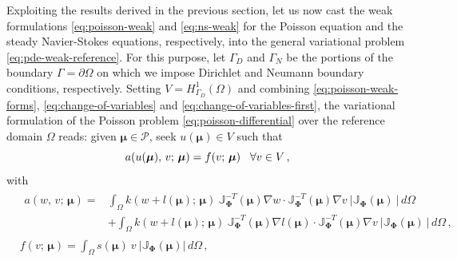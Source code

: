 \documentclass[12pt, a4paper, twoside, openright]{report}
\numberwithin{equation}{chapter}
\theoremstyle{theorem}
\theoremstyle{definition}
\theoremstyle{remark}
\theoremstyle{proposition}
\numberwithin{figure}{chapter}
\newcommand{\bg}[1]{\boldsymbol{#1}}
\begin{document}
		Exploiting the results derived in the previous section, let us now cast the weak formulations \eqref{eq:poisson-weak} and \eqref{eq:ns-weak} for the Poisson equation and the steady Navier-Stokes equations, respectively, into the general variational problem \eqref{eq:pde-weak-reference}. For this purpose, let $\Gamma_D$ and $\Gamma_N$ be the portions of the boundary $\Gamma = \partial \Omega$ on which we impose Dirichlet and Neumann boundary conditions, respectively. Setting $V = H^1_{\Gamma_D}(\Omega)$ and combining \eqref{eq:poisson-weak-forms}, \eqref{eq:change-of-variables} and \eqref{eq:change-of-variables-first}, the variational formulation of the Poisson problem \eqref{eq:poisson-differential} over the reference domain $\Omega$ reads: given $\bg{\mu} \in \mathcal{P}$, seek $u(\bg{\mu}) \in V$ such that
		\begin{equation}
			\label{eq:poisson-weak-reference}
			a(u(\bg{\mu}), \, v; \, \bg{\mu}) = f(v; \, \bg{\mu}) \hspace*{0.3cm} \forall v \in V \, ,
		\end{equation}
		with
		\begin{subequations}
			\label{eq:poisson-weak-forms-reference}
			\begin{align}
				\label{eq:poisson-weak-forms-reference-first}
				&
				\begin{aligned}
				a(w, \, v; \, \bg{\mu}) = & \int_{\Omega} k(w + l(\bg{\mu}); \, \bg{\mu}) ~ \mathbb{J}^{-T}_{\bg{\Phi}}(\bg{\mu}) \nabla w \cdot \mathbb{J}^{-T}_{\bg{\Phi}}(\bg{\mu}) \nabla v ~ \lvert \mathbb{J}_{\bg{\Phi}}(\bg{\mu}) ~ \rvert \, d \Omega \\
				& + \int_{\Omega} k(w + l(\bg{\mu}); \, \bg{\mu}) ~ \mathbb{J}^{-T}_{\bg{\Phi}}(\bg{\mu}) \nabla l(\bg{\mu}) \cdot \mathbb{J}^{-T}_{\bg{\Phi}}(\bg{\mu}) \nabla v ~ \lvert \mathbb{J}_{\bg{\Phi}}(\bg{\mu}) ~ \rvert \, d \Omega \, ,
				\end{aligned} \\
				\label{eq:poisson-weak-forms-reference-second}
				& f(v; \, \bg{\mu}) = \int_{\Omega} s(\bg{\mu}) ~ v ~ \lvert \mathbb{J}_{\bg{\Phi}}(\bg{\mu}) \rvert \, d \Omega \, ,  
			\end{align}
		\end{subequations}
\end{document}
